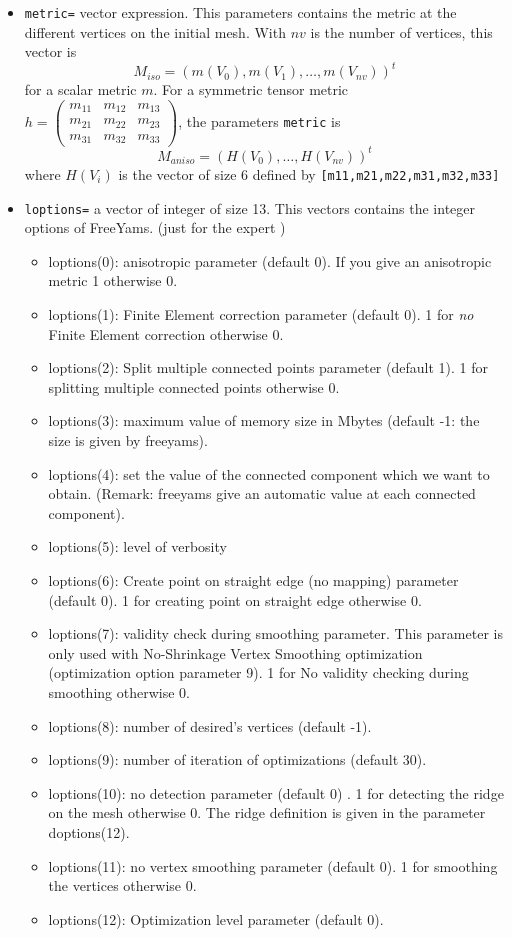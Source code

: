 \documentclass[a4paper,twoside,12pt]{book}
\begin{document}
\begin{itemize}
\item \texttt{metric=} vector expression. This parameters contains the metric at the different vertices on the initial mesh. With $nv$ is the number of vertices, this vector is $$ M_{iso}= ( m(V_0), m(V_1), \ldots, m(V_{nv}) )^t$$  for a scalar metric $m$. For a symmetric tensor metric
$
h=\left(
\begin{array}{ccc}
m_{1 1} & m_{1 2} & m_{1 3}\\
m_{2 1} & m_{2 2} & m_{2 3} \\
m_{3 1} & m_{3 2} & m_{3 3}
\end{array}
\right)$, the parameters \texttt{metric}  is $$M_{aniso}= ( H(V_{0}), \ldots, H(V_{nv}) )^t $$
where $H(V_{i})$ is the vector of size 6 defined by \verb![m11,m21,m22,m31,m32,m33]!
\item \texttt{loptions=} a vector of integer of size 13. This vectors contains the integer options of FreeYams. (just for the expert )
\begin{itemize}
\item loptions(0):  anisotropic parameter (default 0). If you give an anisotropic metric 1 otherwise 0.
\item loptions(1):  Finite Element correction parameter (default 0). 1 for {\it{no}} Finite Element correction otherwise 0.
\item loptions(2):  Split multiple connected points parameter (default 1). 1 for splitting multiple connected points otherwise 0.
\item loptions(3):  maximum value of memory size in Mbytes (default -1: the size is given by freeyams). 	
\item loptions(4):  set the value of the connected component which we want to obtain. (Remark: freeyams give an automatic value at each connected component).
\item loptions(5):  level of verbosity
\item loptions(6):  Create point on straight edge (no mapping) parameter  (default 0). 1 for creating point on straight edge otherwise 0.
\item loptions(7):  validity check during smoothing parameter. This parameter is only used with No-Shrinkage Vertex Smoothing optimization (optimization option parameter 9). 1 for No validity checking during smoothing otherwise 0.
\item loptions(8):  number of desired's vertices  (default -1).
\item loptions(9):  number of iteration of  optimizations (default 30).
\item loptions(10): no  detection parameter (default 0) . 1 for detecting the ridge on the mesh otherwise 0. The ridge definition is given in the parameter doptions(12).
\item loptions(11): no vertex smoothing parameter (default 0). 1 for smoothing the vertices otherwise 0.
\item loptions(12):  Optimization level parameter (default 0). 
\begin{itemize}


\end{itemize}
\end{itemize}
\end{itemize}
\end{document}
